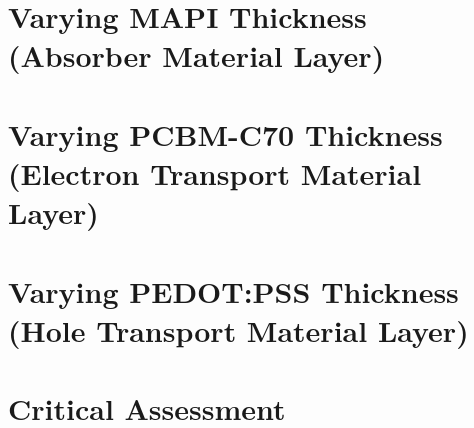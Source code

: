 \section{Varying MAPI Thickness (Absorber Material Layer)}
\section{Varying PCBM-C70 Thickness (Electron Transport Material Layer)}
\section{Varying PEDOT:PSS Thickness (Hole Transport Material Layer)}
\section{Critical Assessment}